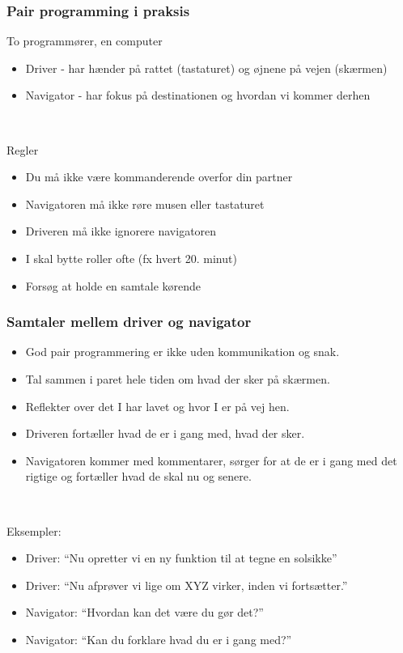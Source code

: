 \documentclass[10pt]{beamer}
\begin{document}
\begin{frame}
  \frametitle{Pair programming i praksis}


 To programmører, en computer
    \begin{itemize}
    \item Driver - har hænder på rattet (tastaturet)
      og øjnene på vejen (skærmen)
    \item Navigator - har fokus på destinationen og
      hvordan vi kommer derhen
    \end{itemize}

~
    
Regler
\begin{itemize}
  \item Du må ikke være kommanderende overfor din partner
  \item Navigatoren må ikke røre musen eller tastaturet
  \item Driveren må ikke ignorere navigatoren
  \item I skal bytte roller ofte (fx hvert 20. minut)
  \item Forsøg at holde en samtale kørende
  \end{itemize}
 \end{frame}

\begin{frame}
  \frametitle{Samtaler mellem driver og navigator}
    \begin{itemize}
  \item God pair programmering er ikke uden kommunikation og snak. 
  \item Tal sammen i paret hele tiden om hvad der sker på
    skærmen. 
  \item Reflekter over det I har lavet og hvor I er på vej hen.
  \item Driveren fortæller hvad de er i gang med, hvad der sker.
  \item Navigatoren kommer med kommentarer, sørger for at de er i gang
    med det rigtige og fortæller hvad de skal nu og senere.
  \end{itemize}

  ~

  Eksempler:
  \begin{itemize}
  \item Driver: ``Nu opretter vi en ny funktion til at tegne en solsikke''
  \item Driver: ``Nu afprøver vi lige om XYZ virker, inden vi fortsætter.''
  \item Navigator: ``Hvordan kan det være du gør det?''
  \item Navigator: ``Kan du forklare hvad du er i gang med?''
  \end{itemize}
\end{frame}
\end{document}
